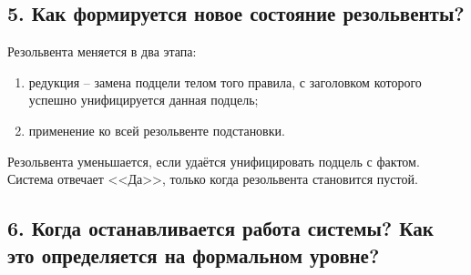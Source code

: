 \subsection*{5. Как формируется новое состояние резольвенты?}

Резольвента меняется в два этапа:

\begin{enumerate}
	\item редукция -- замена подцели телом того правила, с заголовком которого успешно унифицируется данная подцель;
	
	\item применение ко всей резольвенте подстановки.
\end{enumerate}

Резольвента уменьшается, если удаётся унифицировать подцель с фактом. Система отвечает <<Да>>, только когда резольвента становится пустой.

\subsection*{6. Когда останавливается работа системы? Как это определяется на формальном уровне?}
